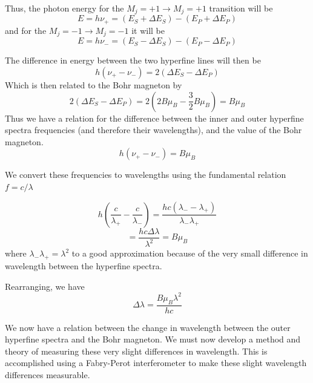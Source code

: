 \documentclass[twocolumn]{article}
\begin{document}
			Thus, the photon energy for the $M_j = +1 \rightarrow M_j = +1$ transition will be
			\begin{equation}
				E = h\nu_+ = (E_S + \Delta E_S) - (E_P + \Delta E_P)
			\end{equation}
			and for the $M_j = -1 \rightarrow M_j = -1$ it will be
			\begin{equation}
				E = h\nu_- = (E_S - \Delta E_S) - (E_P - \Delta E_P)
			\end{equation}
			
			The difference in energy between the two hyperfine lines will then be
			\begin{equation}
				h(\nu_+ - \nu_-) = 2(\Delta E_S - \Delta E_P)
			\end{equation}
			Which is then related to the Bohr magneton by
			\begin{equation}
				2(\Delta E_S - \Delta E_P) = 2\left( 2B\mu_B - \frac{3}{2}B \mu_B \right) = B \mu_B
			\end{equation}
			Thus we have a relation for the difference between the inner and outer hyperfine spectra frequencies (and therefore their wavelengths), and the value of the Bohr magneton.
			\begin{equation}
				h(\nu_+ - \nu_-) = B\mu_B
			\end{equation}
			
			We convert these frequencies to wavelengths using the fundamental relation $f = c/\lambda$
			
			\begin{equation}
				h \left( \frac{c}{\lambda_+} - \frac{c}{\lambda_-} \right) = \frac{hc \left(\lambda_- - \lambda_+ \right)}{\lambda_- \lambda_+}
			\end{equation}
			\begin{equation}
				= \frac{hc\Delta\lambda}{\lambda^2} = B\mu_B
			\end{equation}
			where $\lambda_-\lambda_+ = \lambda^2$ to a good approximation because of the very small difference in wavelength between the hyperfine spectra.
			
			Rearranging, we have
			\begin{equation}
				\Delta\lambda = \frac{B\mu_B\lambda^2}{hc}
				\label{eq:WavelengthEq}
			\end{equation}
			
			We now have a relation between the change in wavelength between the outer hyperfine spectra and the Bohr magneton.
			We must now develop a method and theory of measuring these very slight differences in wavelength.
			This is accomplished using a Fabry-Perot interferometer to make these slight wavelength differences measurable.
			
\end{document}
